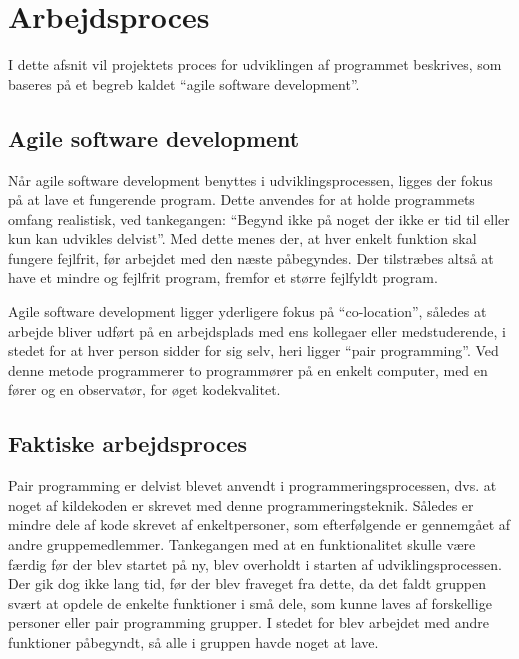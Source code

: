 \chapter{Arbejdsproces}\label{chap:arbejdsproces}

I dette afsnit vil projektets proces for udviklingen af programmet beskrives, som baseres på et begreb kaldet ``agile software development''.

\section{Agile software development}\label{sec:agile-software-development}
Når agile software development benyttes i udviklingsprocessen, ligges der fokus på at lave et fungerende program.
Dette anvendes for at holde programmets omfang realistisk, ved tankegangen:
``Begynd ikke på noget der ikke er tid til eller kun kan udvikles delvist''.
Med dette menes der, at hver enkelt funktion skal fungere fejlfrit, før arbejdet med den næste påbegyndes. 
Der tilstræbes altså at have et mindre og fejlfrit program, fremfor et større fejlfyldt program.

Agile software development ligger yderligere fokus på ``co-location'', således at arbejde bliver udført på en arbejdsplads med ens kollegaer eller medstuderende, i stedet for at hver person sidder for sig selv, heri ligger ``pair programming''. 
Ved denne metode programmerer to programmører på en enkelt computer, med en fører og en observatør, for øget kodekvalitet.\citep{agile_software}

\section{Faktiske arbejdsproces}\label{sec:faktiske-arbejdsproces}
Pair programming er delvist blevet anvendt i programmeringsprocessen, dvs. at noget af kildekoden er skrevet med denne programmeringsteknik.
Således er mindre dele af kode skrevet af enkeltpersoner, som efterfølgende er gennemgået af andre gruppemedlemmer.
Tankegangen med at en funktionalitet skulle være færdig før der blev startet på ny, blev overholdt i starten af udviklingsprocessen.
Der gik dog ikke lang tid, før der blev fraveget fra dette, da det faldt gruppen svært at opdele de enkelte funktioner i små dele, som kunne laves af forskellige personer eller pair programming grupper.
I stedet for blev arbejdet med andre funktioner påbegyndt, så alle i gruppen havde noget at lave.  
